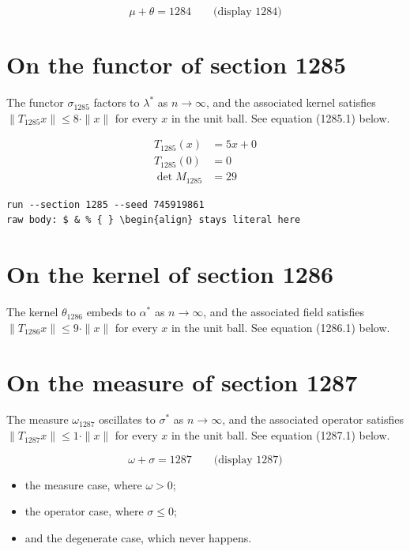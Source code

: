 \documentclass{article}
\begin{document}
$$
\mu + \theta = 1284 \qquad \text{(display 1284)}
$$

\section{On the functor of section 1285}
The functor $\sigma_{1285}$ factors to $\lambda^{*}$ as $n \to \infty$,
and the associated kernel satisfies $\|T_{1285} x\| \leq 8 \cdot \|x\|$
for every $x$ in the unit ball. See equation (1285.1) below.

\begin{align}
T_{1285}(x) &= 5 x + 0 \\
T_{1285}(0) &= 0 \\
\det M_{1285} &= 29
\end{align}

\begin{verbatim}
run --section 1285 --seed 745919861
raw body: $ & % { } \begin{align} stays literal here
\end{verbatim}

\section{On the kernel of section 1286}
The kernel $\theta_{1286}$ embeds to $\alpha^{*}$ as $n \to \infty$,
and the associated field satisfies $\|T_{1286} x\| \leq 9 \cdot \|x\|$
for every $x$ in the unit ball. See equation (1286.1) below.

\section{On the measure of section 1287}
The measure $\omega_{1287}$ oscillates to $\sigma^{*}$ as $n \to \infty$,
and the associated operator satisfies $\|T_{1287} x\| \leq 1 \cdot \|x\|$
for every $x$ in the unit ball. See equation (1287.1) below.

$$
\omega + \sigma = 1287 \qquad \text{(display 1287)}
$$

\begin{itemize}
  \item the measure case, where $\omega > 0$;
  \item the operator case, where $\sigma \leq 0$;
  \item and the degenerate case, which never happens.
\end{itemize}
\end{document}
